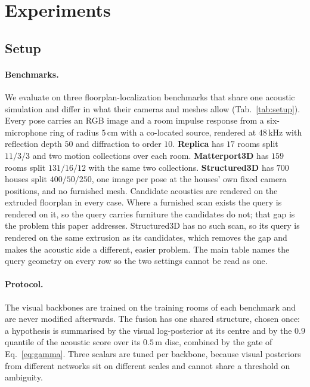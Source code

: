 
\section{Experiments}
\label{sec:exp}

\subsection{Setup}
\label{sec:protocol}

\paragraph{Benchmarks.} We evaluate on three floorplan-localization benchmarks
that share one acoustic simulation and differ in what their cameras and meshes
allow (Tab.~\ref{tab:setup}). Every pose carries an RGB image and a room impulse
response from a six-microphone ring of radius $5$\,cm with a co-located source,
rendered at $48$\,kHz with reflection depth $50$ and diffraction to order $10$.
\textbf{Replica} has $17$ rooms split $11/3/3$ and two motion collections over
each room. \textbf{Matterport3D} has $159$ rooms split $131/16/12$ with the same
two collections. \textbf{Structured3D} has $700$ houses split $400/50/250$, one
image per pose at the houses' own fixed camera positions, and no furnished
mesh. Candidate acoustics are rendered on the extruded floorplan in every case.
Where a furnished scan exists the query is rendered on it, so the query carries
furniture the candidates do not; that gap is the problem this paper addresses.
Structured3D has no such scan, so its query is rendered on the same extrusion as
its candidates, which removes the gap and makes the acoustic side a different,
easier problem. The main table names the query geometry on every row so the two
settings cannot be read as one.

\paragraph{Protocol.} The visual backbones are trained on the training rooms
of each benchmark and are never modified afterwards. The fusion has one shared
structure, chosen once: a hypothesis is summarised by the visual log-posterior
at its centre and by the $0.9$ quantile of the acoustic score over its $0.5$\,m
disc, combined by the gate of Eq.~\eqref{eq:gamma}. Three scalars are
tuned per backbone, because visual posteriors from different networks sit on
different scales and cannot share a threshold on ambiguity.

